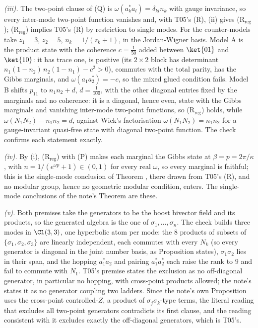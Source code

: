 \emph{(iii).} The two-point clause of (Q) is $\omega(a_{k}^{*}a_{l}) = \delta_{kl}n_{k}$ with gauge invariance, so every inter-mode two-point function vanishes and, with T05's (R), (ii) gives (R$_{\mathrm{reg}}$); (R$_{\mathrm{reg}}$) implies T05's (R) by restriction to single modes. For the counter-models take $z_{1} = 3$, $z_{2} = 5$, $n_{k} = 1/(z_{k} + 1)$, in the Jordan-Wigner basis. Model A is the product state with the coherence $c = \tfrac{1}{50}$ added between $\ket{01}$ and $\ket{10}$: it has trace one, is positive (its $2\times2$ block has determinant $n_{1}(1 - n_{2})\,n_{2}(1 - n_{1}) - c^{2} > 0$), commutes with the total parity, has the Gibbs marginals, and $\omega(a_{1}a_{2}^{*}) = -c$, so the mixed glued condition fails. Model B shifts $p_{11}$ to $n_{1}n_{2} + d$, $d = \tfrac{1}{100}$, with the other diagonal entries fixed by the marginals and no coherence: it is a diagonal, hence even, state with the Gibbs marginals and vanishing inter-mode two-point functions, so (R$_{\mathrm{reg}}$) holds, while $\omega(N_{1}N_{2}) - n_{1}n_{2} = d$, against Wick's factorisation $\omega(N_{1}N_{2}) = n_{1}n_{2}$ for a gauge-invariant quasi-free state with diagonal two-point function. The check confirms each statement exactly.

\emph{(iv).} By (i), (R$_{\mathrm{reg}}$) with (P) makes each marginal the Gibbs state at $\beta = p = 2\pi/\kappa$, with $n = 1/(e^{\omega p} + 1) \in (0, 1)$ for every real $\omega$, so every marginal is faithful; this is the single-mode conclusion of Theorem , there drawn from T05's (R), and no modular group, hence no geometric modular condition, enters. The single-mode conclusions of the note's Theorem  are these.

\emph{(v).} Both premises take the generators to be the boost bivector field and its products, so the generated algebra is the one of $\sigma_{1}, \ldots, \sigma_{n}$. The check builds three modes in $\Cl(3,3)$, one hyperbolic atom per mode: the $8$ products of subsets of $\{\sigma_{1}, \sigma_{2}, \sigma_{3}\}$ are linearly independent, each commutes with every $N_{k}$ (so every generator is diagonal in the joint number basis, as Proposition  states), $\sigma_{1}\sigma_{2}$ lies in their span, and the hopping $a_{1}^{*}a_{2}$ and pairing $a_{1}^{*}a_{2}^{*}$ each raise the rank to $9$ and fail to commute with $N_{1}$. T05's premise states the exclusion as no off-diagonal generator, in particular no hopping, with cross-point products allowed; the note's states it as no generator coupling two ladders. Since the note's own Proposition uses the cross-point controlled-$Z$, a product of $\sigma_{j}\sigma_{k}$-type terms, the literal reading that excludes all two-point generators contradicts its first clause, and the reading consistent with it excludes exactly the off-diagonal generators, which is T05's.
